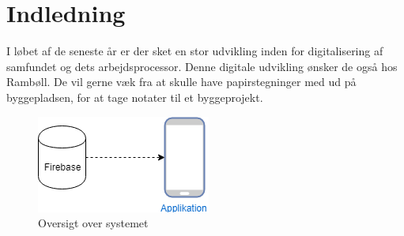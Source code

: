\chapter{Indledning}

I løbet af de seneste år er der sket en stor udvikling inden for digitalisering af samfundet og dets arbejdsprocessor. Denne digitale udvikling ønsker de også hos Rambøll. De vil gerne væk fra at skulle have papirstegninger med ud på byggepladsen, for at tage notater til et byggeprojekt.





\begin{figure}[H]
	\centering
	\includegraphics[width=0.4\linewidth]{Indledning/Oversigtoversystem}
	\caption{Oversigt over systemet}
	\label{fig:OversigtSystembeskrivelse}
\end{figure}


